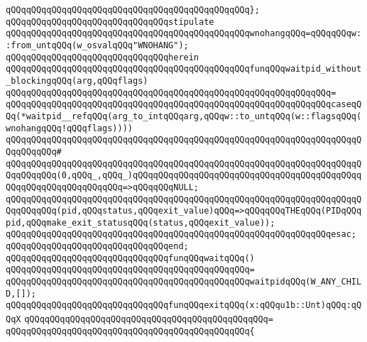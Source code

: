 \verb|qQQqqQQqqQQqqQQqqQQqqQQqqQQqqQQqqQQqqQQqqQQqqQQq};|\newline
\newline
\verb|qQQqqQQqqQQqqQQqqQQqqQQqqQQqqQQqstipulate|\newline
\verb|qQQqqQQqqQQqqQQqqQQqqQQqqQQqqQQqqQQqqQQqqQQqqQQqwnohangqQQq=qQQqqQQqw::from_untqQQq(w_osvalqQQq"WNOHANG");|\newline
\verb|qQQqqQQqqQQqqQQqqQQqqQQqqQQqqQQqherein|\newline
\verb|qQQqqQQqqQQqqQQqqQQqqQQqqQQqqQQqqQQqqQQqqQQqqQQqfunqQQqwaitpid_without_blockingqQQq(arg,qQQqflags)|\newline
\verb|qQQqqQQqqQQqqQQqqQQqqQQqqQQqqQQqqQQqqQQqqQQqqQQqqQQqqQQqqQQqqQQq=|\newline
\verb|qQQqqQQqqQQqqQQqqQQqqQQqqQQqqQQqqQQqqQQqqQQqqQQqqQQqqQQqqQQqqQQqcaseqQQq(*waitpid__refqQQq(arg_to_intqQQqarg,qQQqw::to_untqQQq(w::flagsqQQq(wnohangqQQq!qQQqflags))))|\newline
\verb|qQQqqQQqqQQqqQQqqQQqqQQqqQQqqQQqqQQqqQQqqQQqqQQqqQQqqQQqqQQqqQQqqQQqqQQqqQQqqQQq#|\newline
\verb|qQQqqQQqqQQqqQQqqQQqqQQqqQQqqQQqqQQqqQQqqQQqqQQqqQQqqQQqqQQqqQQqqQQqqQQqqQQqqQQq(0,qQQq_,qQQq_)qQQqqQQqqQQqqQQqqQQqqQQqqQQqqQQqqQQqqQQqqQQqqQQqqQQqqQQqqQQqqQQqqQQq=>qQQqqQQqNULL;|\newline
\verb|qQQqqQQqqQQqqQQqqQQqqQQqqQQqqQQqqQQqqQQqqQQqqQQqqQQqqQQqqQQqqQQqqQQqqQQqqQQqqQQq(pid,qQQqstatus,qQQqexit_value)qQQq=>qQQqqQQqTHEqQQq(PIDqQQqpid,qQQqmake_exit_statusqQQq(status,qQQqexit_value));|\newline
\verb|qQQqqQQqqQQqqQQqqQQqqQQqqQQqqQQqqQQqqQQqqQQqqQQqqQQqqQQqqQQqqQQqesac;|\newline
\verb|qQQqqQQqqQQqqQQqqQQqqQQqqQQqqQQqend;|\newline
\newline
\verb|qQQqqQQqqQQqqQQqqQQqqQQqqQQqqQQqfunqQQqwaitqQQq()|\newline
\verb|qQQqqQQqqQQqqQQqqQQqqQQqqQQqqQQqqQQqqQQqqQQqqQQq=|\newline
\verb|qQQqqQQqqQQqqQQqqQQqqQQqqQQqqQQqqQQqqQQqqQQqqQQqwaitpidqQQq(W_ANY_CHILD,[]);|\newline
\newline
\newline
\verb|qQQqqQQqqQQqqQQqqQQqqQQqqQQqqQQqfunqQQqexitqQQq(x:qQQqu1b::Unt)qQQq:qQQqX|\newline
\verb|qQQqqQQqqQQqqQQqqQQqqQQqqQQqqQQqqQQqqQQqqQQqqQQq=|\newline
\verb|qQQqqQQqqQQqqQQqqQQqqQQqqQQqqQQqqQQqqQQqqQQqqQQq{|\newline
